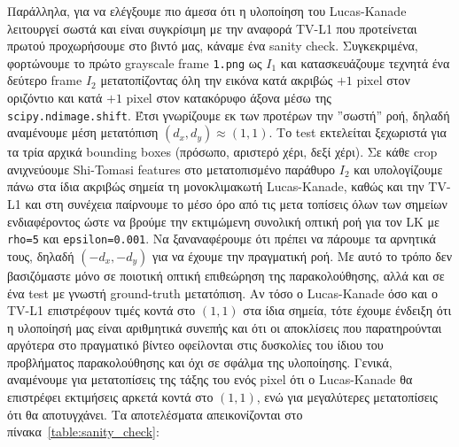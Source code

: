 \documentclass[12pt, a4paper]{article}
\begin{document}
Παράλληλα, για να ελέγξουμε πιο άμεσα ότι η υλοποίηση του Lucas-Kanade λειτουργεί σωστά και είναι συγκρίσιμη με την αναφορά TV-L1 που προτείνεται πρωτού προχωρήσουμε στο βιντό μας, κάναμε ένα sanity check. Συγκεκριμένα, φορτώνουμε το πρώτο grayscale frame \texttt{1.png} ως $I_1$ και κατασκευάζουμε τεχνητά ένα δεύτερο frame $I_2$ μετατοπίζοντας όλη την εικόνα κατά ακριβώς $+1$ pixel στον οριζόντιο και κατά $+1$ pixel στον κατακόρυφο άξονα μέσω της \texttt{scipy.ndimage.shift}. Έτσι γνωρίζουμε εκ των προτέρων την ''σωστή'' ροή, δηλαδή αναμένουμε μέση μετατόπιση $(d_x,d_y)\approx(1,1)$.
Το test εκτελείται ξεχωριστά για τα τρία αρχικά bounding boxes (πρόσωπο, αριστερό χέρι, δεξί χέρι). Σε κάθε crop ανιχνεύουμε Shi-Tomasi features στο μετατοπισμένο παράθυρο $I_2$ και υπολογίζουμε πάνω στα ίδια ακριβώς σημεία τη μονοκλιμακωτή Lucas-Kanade, καθώς και την TV-L1 και στη συνέχεια παίρνουμε το μέσο όρο από τις μετα
τοπίσεις όλων των σημείων ενδιαφέροντος ώστε να βρούμε την εκτιμώμενη συνολική οπτική ροή για τον LK με \texttt{rho=5} και \texttt{epsilon=0.001}. Να ξαναναφέρουμε ότι πρέπει να πάρουμε τα αρνητικά τους, δηλαδή $(-d_x,-d_y)$ για να έχουμε την πραγματική ροή.
Με αυτό το τρόπο δεν βασιζόμαστε μόνο σε ποιοτική οπτική επιθεώρηση της παρακολούθησης, αλλά και σε ένα test με γνωστή ground-truth μετατόπιση. Αν τόσο ο Lucas-Kanade όσο και ο TV-L1 επιστρέφουν τιμές κοντά στο $(1,1)$ στα ίδια σημεία, τότε έχουμε ένδειξη ότι η υλοποίησή μας είναι αριθμητικά συνεπής
και ότι οι αποκλίσεις που παρατηρούνται αργότερα στο πραγματικό βίντεο οφείλονται στις δυσκολίες του ίδιου του προβλήματος παρακολούθησης και όχι σε  σφάλμα της υλοποίησης. Γενικά, αναμένουμε για μετατοπίσεις της τάξης 
του ενός pixel ότι ο Lucas-Kanade θα επιστρέφει εκτιμήσεις αρκετά κοντά στο $(1,1)$, ενώ για μεγαλύτερες μετατοπίσεις ότι θα αποτυγχάνει.
Τα αποτελέσματα απεικονίζονται στο πίνακα~\ref{table:sanity_check}:
\end{document}

